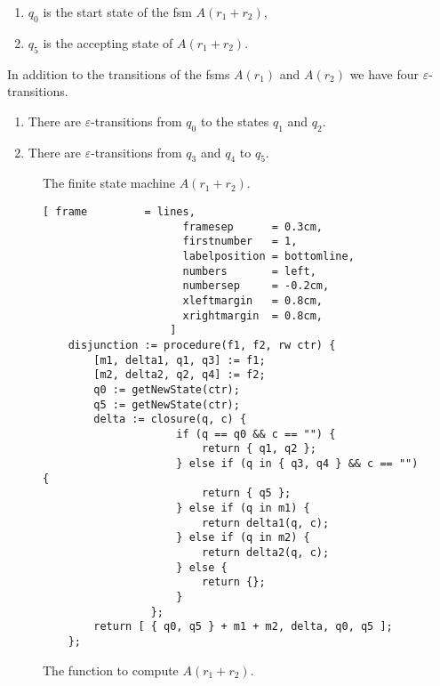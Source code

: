\begin{enumerate}
\begin{enumerate}
      \item $q_0$ is the start state of the fsm $A(r_1 + r_2)$,
      \item $q_5$ is the accepting state of $A(r_1 + r_2)$.
      \end{enumerate}
      In addition to the transitions of the fsms  $A(r_1)$ and $A(r_2)$ we have four $\varepsilon$-transitions.
      \begin{enumerate}
      \item There are $\varepsilon$-transitions from $q_0$ to the states $q_1$ and $q_2$.
      \item There are $\varepsilon$-transitions from  $q_3$ and $q_4$ to $q_5$.
      \end{enumerate}
                   
      \begin{figure}[!ht]
        \centering
      \caption{The finite state machine $A(r_1 + r_2)$.}
      \label{fig:aPlus.eps}
      \end{figure}

    \begin{figure}[!ht]
    \centering
    \begin{Verbatim}[ frame         = lines, 
                      framesep      = 0.3cm, 
                      firstnumber   = 1,
                      labelposition = bottomline,
                      numbers       = left,
                      numbersep     = -0.2cm,
                      xleftmargin   = 0.8cm,
                      xrightmargin  = 0.8cm,
                    ]
    disjunction := procedure(f1, f2, rw ctr) {
        [m1, delta1, q1, q3] := f1;
        [m2, delta2, q2, q4] := f2;
        q0 := getNewState(ctr); 
        q5 := getNewState(ctr); 
        delta := closure(q, c) {
                     if (q == q0 && c == "") {
                         return { q1, q2 };
                     } else if (q in { q3, q4 } && c == "") {
                         return { q5 };
                     } else if (q in m1) {
                         return delta1(q, c);
                     } else if (q in m2) {
                         return delta2(q, c);
                     } else {
                         return {};
                     } 
                 };
        return [ { q0, q5 } + m1 + m2, delta, q0, q5 ];
    };
    \end{Verbatim}
    \vspace*{-0.3cm}
    \caption{The function to compute $A(r_1 + r_2)$.}
    \label{fig:disjunction.stlx}
    \end{figure}
      

\end{enumerate}
